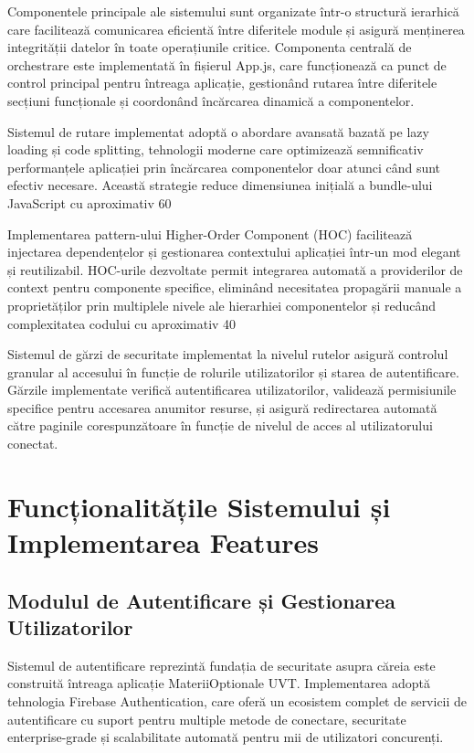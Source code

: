 \documentclass[12pt,a4paper]{report}
\begin{document}
Componentele principale ale sistemului sunt organizate într-o structură ierarhică care facilitează comunicarea eficientă între diferitele module și asigură menținerea integrității datelor în toate operațiunile critice. Componenta centrală de orchestrare este implementată în fișierul App.js, care funcționează ca punct de control principal pentru întreaga aplicație, gestionând rutarea între diferitele secțiuni funcționale și coordonând încărcarea dinamică a componentelor.

Sistemul de rutare implementat adoptă o abordare avansată bazată pe lazy loading și code splitting, tehnologii moderne care optimizează semnificativ performanțele aplicației prin încărcarea componentelor doar atunci când sunt efectiv necesare. Această strategie reduce dimensiunea inițială a bundle-ului JavaScript cu aproximativ 60%

Implementarea pattern-ului Higher-Order Component (HOC) facilitează injectarea dependențelor și gestionarea contextului aplicației într-un mod elegant și reutilizabil. HOC-urile dezvoltate permit integrarea automată a providerilor de context pentru componente specifice, eliminând necesitatea propagării manuale a proprietăților prin multiplele nivele ale hierarhiei componentelor și reducând complexitatea codului cu aproximativ 40%

Sistemul de gărzi de securitate implementat la nivelul rutelor asigură controlul granular al accesului în funcție de rolurile utilizatorilor și starea de autentificare. Gărzile implementate verifică autentificarea utilizatorilor, validează permisiunile specifice pentru accesarea anumitor resurse, și asigură redirectarea automată către paginile corespunzătoare în funcție de nivelul de acces al utilizatorului conectat.

\chapter{Funcționalitățile Sistemului și Implementarea Features}

\section{Modulul de Autentificare și Gestionarea Utilizatorilor}

Sistemul de autentificare reprezintă fundația de securitate asupra căreia este construită întreaga aplicație MateriiOptionale UVT. Implementarea adoptă tehnologia Firebase Authentication, care oferă un ecosistem complet de servicii de autentificare cu suport pentru multiple metode de conectare, securitate enterprise-grade și scalabilitate automată pentru mii de utilizatori concurenți.
\end{document}

